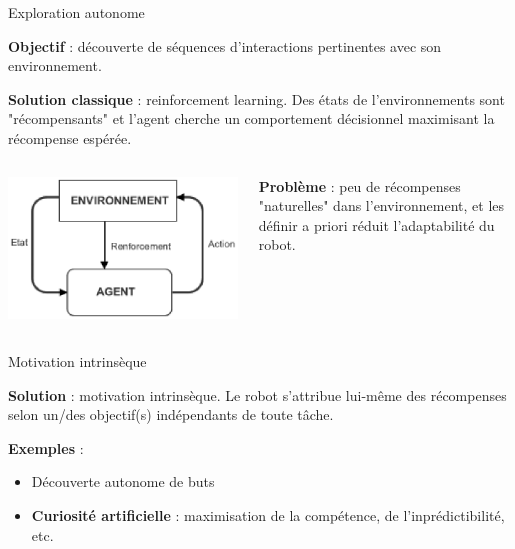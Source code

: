 \documentclass[xcolor=pst,dvips,12pt,english,french]{beamer}
\begin{document}
	\begin{frame}{Exploration autonome}
		
		\begin{block}{}
			\textbf{Objectif} : découverte de séquences d'interactions pertinentes avec son environnement.
		\end{block}
		\begin{exampleblock}{}
			\textbf{Solution classique} : reinforcement learning. Des états de l'environnements sont "récompensants" et l'agent cherche un comportement décisionnel maximisant la récompense espérée.
		\end{exampleblock}
		\begin{columns}
			\begin{column}{0.4\textwidth}
				\centering
				\includegraphics[width=\textwidth, trim={0 0 1cm 0, clip}]{images/RL1.eps}
			\end{column}
			\begin{column}{0.5\textwidth}
				\begin{alertblock}{}
					\textbf{Problème} : peu de récompenses "naturelles" dans l'environnement, et les définir a priori réduit l'adaptabilité du robot.
				\end{alertblock}
			\end{column}
		\end{columns}
		\vfill
		\tiny

	\end{frame}
	
	\begin{frame}{Motivation intrinsèque}
		\begin{block}{}
			\textbf{Solution} : motivation intrinsèque. Le robot s'attribue lui-même des récompenses selon un/des objectif(s) indépendants de toute tâche. 
		\end{block}
		\begin{exampleblock}{}
			\textbf{Exemples} : 
			\begin{itemize}
				\item Découverte autonome de buts
				\item \textbf{Curiosité artificielle} : maximisation de la compétence, de l'inprédictibilité, etc.
			\end{itemize}
		\end{exampleblock} 
		\vfill
		\tiny
		\\
	\end{frame}
	
\end{document}
